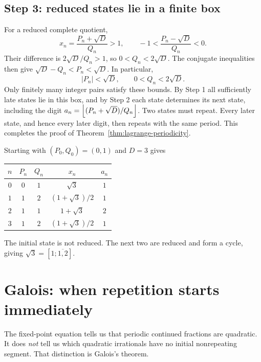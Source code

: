 \subsection*{Step 3: reduced states lie in a finite box}
For a reduced complete quotient,
\[
 x_n=\frac{P_n+\sqrt D}{Q_n}>1,\qquad
 -1<\frac{P_n-\sqrt D}{Q_n}<0.
\]
Their difference is $2\sqrt D/Q_n>1$, so
$0<Q_n<2\sqrt D$. The conjugate inequalities then give
$\sqrt D-Q_n<P_n<\sqrt D$. In particular,
\begin{equation}\label{eq:reduced-state-bounds}
 \boxed{\quad |P_n|<\sqrt D,\qquad 0<Q_n<2\sqrt D.\quad}
\end{equation}
Only finitely many integer pairs satisfy these bounds.
By Step 1 all sufficiently late states lie in this box, and by Step 2
each state determines its next state, including the digit
$a_n=\left\lfloor (P_n+\sqrt D)/Q_n\right\rfloor$.
Two states must repeat. Every later state, and hence every later digit,
then repeats with the same period. This completes the proof of
Theorem~\ref{thm:lagrange-periodicity}.

\begin{example}
Starting with $(P_0,Q_0)=(0,1)$ and $D=3$ gives
\begin{center}
\begin{tabular}{ccccc}
\toprule
$n$ & $P_n$ & $Q_n$ & $x_n$ & $a_n$\\
\midrule
$0$ & $0$ & $1$ & $\sqrt3$ & $1$\\
$1$ & $1$ & $2$ & $(1+\sqrt3)/2$ & $1$\\
$2$ & $1$ & $1$ & $1+\sqrt3$ & $2$\\
$3$ & $1$ & $2$ & $(1+\sqrt3)/2$ & $1$\\
\bottomrule
\end{tabular}
\end{center}
The initial state is not reduced. The next two are reduced and form a
cycle, giving $\sqrt3=[1;\overline{1,2}]$.
\end{example}

\section{Galois: when repetition starts immediately}
\label{sec:galois}

The fixed-point equation tells us that periodic continued fractions are
quadratic. It does \emph{not} tell us which quadratic irrationals have
no initial nonrepeating segment. That distinction is Galois's theorem.

